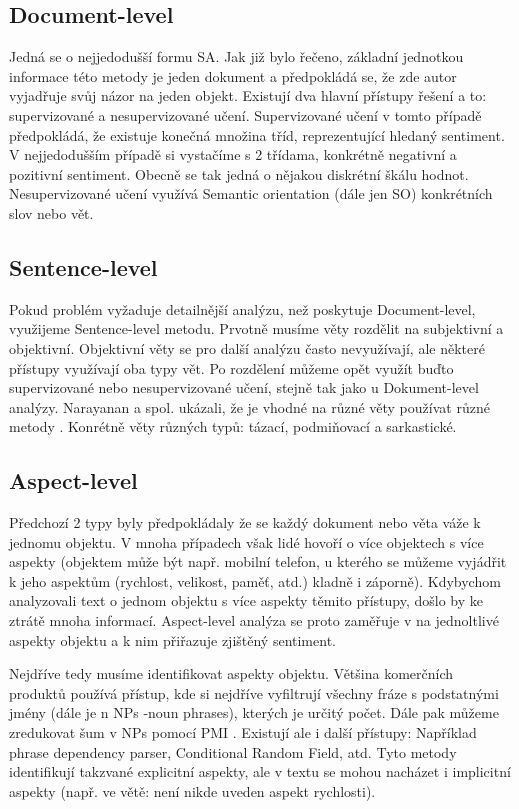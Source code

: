 \subsection{Document-level}
Jedná se o nejjedodušší formu SA. Jak již bylo řečeno, základní jednotkou informace této metody je jeden dokument a předpokládá se, že zde autor vyjadřuje svůj názor na jeden objekt. Existují dva hlavní přístupy řešení a to: supervizované a nesupervizované učení. Supervizované učení v tomto případě předpokládá, že existuje konečná množina tříd, reprezentující hledaný sentiment.  V nejjedodušším případě si vystačíme s 2 třídama, konkrétně negativní a pozitivní sentiment. Obecně se tak jedná o nějakou diskrétní škálu hodnot. 
Nesupervizované učení využívá Semantic orientation (dále jen SO)  konkrétních slov nebo vět. 
\subsection{Sentence-level}
Pokud problém vyžaduje detailnější analýzu, než poskytuje Document-level, využijeme Sentence-level metodu. Prvotně musíme věty rozdělit na subjektivní a objektivní. Objektivní věty se pro další analýzu často nevyužívají, ale některé přístupy využívají oba typy vět. Po rozdělení můžeme opět využít buďto supervizované nebo nesupervizované učení, stejně tak jako u Dokument-level analýzy.
Narayanan a spol. ukázali, že je vhodné na různé věty používat různé metody \cite{Feldman24}. Konrétně věty různých typů: tázací, podmiňovací a sarkastické. 
\subsection{Aspect-level}
Předchozí 2 typy byly předpokládaly že se každý dokument nebo věta váže k jednomu objektu. V mnoha případech však lidé hovoří o více objektech s více aspekty (objektem může být např. mobilní telefon, u kterého se můžeme vyjádřit k jeho aspektům (rychlost, velikost, paměť, atd.) kladně i záporně). Kdybychom analyzovali text o jednom objektu s více aspekty těmito přístupy, došlo by ke ztrátě mnoha informací. Aspect-level analýza se proto zaměřuje v na jednoltlivé aspekty objektu a k nim přiřazuje zjištěný sentiment. 

Nejdříve tedy musíme identifikovat aspekty objektu. Většina komerčních produktů používá přístup, kde si nejdříve vyfiltrují všechny fráze s podstatnými jmény (dále je n NPs -noun
phrases), kterých je určitý počet. \cite{Feldman} Dále pak můžeme zredukovat šum v NPs  pomocí PMI . Existují ale i další přístupy: Například phrase dependency parser, Conditional Random Field, atd. Tyto metody identifikují takzvané explicitní aspekty, ale v textu se mohou nacházet i implicitní aspekty (např. ve větě:  není nikde uveden aspekt rychlosti).  \cite*[překlad vlastní]{Feldman}

